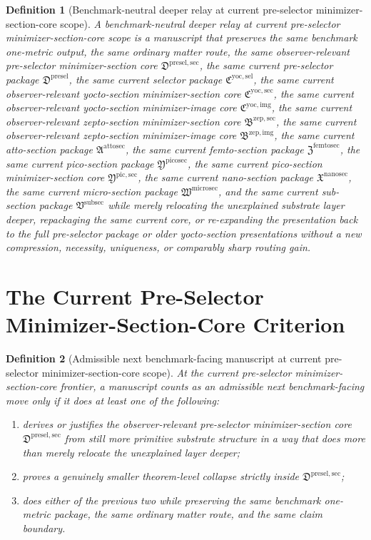 \documentclass[11pt]{article}
\newcommand{\PreSelectorPackage}{\mathfrak D^{\mathrm{presel}}}
\newcommand{\PreSelectorMinSectionCore}{\mathfrak D^{\mathrm{presel,sec}}}
\newcommand{\YoctoSelectorPackage}{\mathfrak C^{\mathrm{yoc,sel}}}
\newcommand{\YoctoImageCore}{\mathfrak C^{\mathrm{yoc,img}}}
\newcommand{\YoctoMinSectionCore}{\mathfrak C^{\mathrm{yoc,sec}}}
\newcommand{\ZeptoImageCore}{\mathfrak B^{\mathrm{zep,img}}}
\newcommand{\ZeptoMinSectionCore}{\mathfrak B^{\mathrm{zep,sec}}}
\newcommand{\AttoSectionPackage}{\mathfrak A^{\mathrm{attosec}}}
\newcommand{\FemtoSectionPackage}{\mathfrak Z^{\mathrm{femtosec}}}
\newcommand{\PicoSectionPackage}{\mathfrak Y^{\mathrm{picosec}}}
\newcommand{\PicoMinSectionCore}{\mathfrak Y^{\mathrm{pic,sec}}}
\newcommand{\NanoSectionPackage}{\mathfrak X^{\mathrm{nanosec}}}
\newcommand{\MicroSectionPackage}{\mathfrak W^{\mathrm{microsec}}}
\newcommand{\SubSectionPackage}{\mathfrak V^{\mathrm{subsec}}}
\newtheorem{definition}{Definition}
\begin{document}
\begin{definition}[Benchmark-neutral deeper relay at current pre-selector minimizer-section-core scope]
A \emph{benchmark-neutral deeper relay at current pre-selector minimizer-section-core scope} is a manuscript that preserves the same benchmark one-metric output, the same ordinary matter route, the same observer-relevant pre-selector minimizer-section core \(\PreSelectorMinSectionCore\), the same current pre-selector package \(\PreSelectorPackage\), the same current selector package \(\YoctoSelectorPackage\), the same current observer-relevant yocto-section minimizer-section core \(\YoctoMinSectionCore\), the same current observer-relevant yocto-section minimizer-image core \(\YoctoImageCore\), the same current observer-relevant zepto-section minimizer-section core \(\ZeptoMinSectionCore\), the same current observer-relevant zepto-section minimizer-image core \(\ZeptoImageCore\), the same current atto-section package \(\AttoSectionPackage\), the same current femto-section package \(\FemtoSectionPackage\), the same current pico-section package \(\PicoSectionPackage\), the same current pico-section minimizer-section core \(\PicoMinSectionCore\), the same current nano-section package \(\NanoSectionPackage\), the same current micro-section package \(\MicroSectionPackage\), and the same current sub-section package \(\SubSectionPackage\) while merely relocating the unexplained substrate layer deeper, repackaging the same current core, or re-expanding the presentation back to the full pre-selector package or older yocto-section presentations without a new compression, necessity, uniqueness, or comparably sharp routing gain.
\end{definition}

\section{The Current Pre-Selector Minimizer-Section-Core Criterion}

\begin{definition}[Admissible next benchmark-facing manuscript at current pre-selector minimizer-section-core scope]
At the current pre-selector minimizer-section-core frontier, a manuscript counts as an admissible next benchmark-facing move only if it does at least one of the following:
\begin{enumerate}
    \item derives or justifies the observer-relevant pre-selector minimizer-section core \(\PreSelectorMinSectionCore\) from still more primitive substrate structure in a way that does more than merely relocate the unexplained layer deeper;
    \item proves a genuinely smaller theorem-level collapse strictly inside \(\PreSelectorMinSectionCore\);
    \item does either of the previous two while preserving the same benchmark one-metric package, the same ordinary matter route, and the same claim boundary.
\end{enumerate}
\end{definition}
\end{document}
